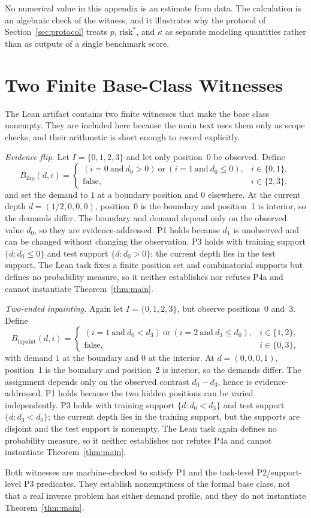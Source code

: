 \documentclass[twoside,11pt]{article}
\begin{document}
No numerical value in this appendix is an estimate from data. The calculation is an algebraic check of the witness, and it illustrates why the protocol of Section~\ref{sec:protocol} treats $p$, $\mathrm{risk}^*$, and $\kappa$ as separate modeling quantities rather than as outputs of a single benchmark score.

\section{Two Finite Base-Class Witnesses}
\label{app:witnesses}

The Lean artifact contains two finite witnesses that make the base class nonempty. They are included here because the main text uses them only as scope checks, and their arithmetic is short enough to record explicitly.

\emph{Evidence flip.}
Let $I=\{0,1,2,3\}$ and let only position~0 be observed. Define
\[
B_{\mathrm{flip}}(d,i)=
\begin{cases}
(i=0\ \text{and}\ d_0>0)\ \text{or}\ (i=1\ \text{and}\ d_0\le0), & i\in\{0,1\},\\
\text{false}, & i\in\{2,3\},
\end{cases}
\]
and set the demand to $1$ at a boundary position and $0$ elsewhere. At the current depth $d=(1/2,0,0,0)$, position~0 is the boundary and position~1 is interior, so the demands differ. The boundary and demand depend only on the observed value $d_0$, so they are evidence-addressed. P1 holds because $d_1$ is unobserved and can be changed without changing the observation. P3 holds with training support $\{d:d_0\le0\}$ and test support $\{d:d_0>0\}$; the current depth lies in the test support. The Lean task fixes a finite position set and combinatorial supports but defines no probability measure, so it neither establishes nor refutes P4a and cannot instantiate Theorem~\ref{thm:main}.

\emph{Two-ended inpainting.}
Again let $I=\{0,1,2,3\}$, but observe positions~0 and~3. Define
\[
B_{\mathrm{inpaint}}(d,i)=
\begin{cases}
(i=1\ \text{and}\ d_0<d_3)\ \text{or}\ (i=2\ \text{and}\ d_3\le d_0), & i\in\{1,2\},\\
\text{false}, & i\in\{0,3\},
\end{cases}
\]
with demand $1$ at the boundary and $0$ at the interior. At $d=(0,0,0,1)$, position~1 is the boundary and position~2 is interior, so the demands differ. The assignment depends only on the observed contrast $d_0-d_3$, hence is evidence-addressed. P1 holds because the two hidden positions can be varied independently. P3 holds with training support $\{d:d_0<d_3\}$ and test support $\{d:d_3<d_0\}$; the current depth lies in the training support, but the supports are disjoint and the test support is nonempty. The Lean task again defines no probability measure, so it neither establishes nor refutes P4a and cannot instantiate Theorem~\ref{thm:main}.

Both witnesses are machine-checked to satisfy P1 and the task-level P2/support-level P3 predicates. They establish nonemptiness of the formal base class, not that a real inverse problem has either demand profile, and they do not instantiate Theorem~\ref{thm:main}.


\end{document}
